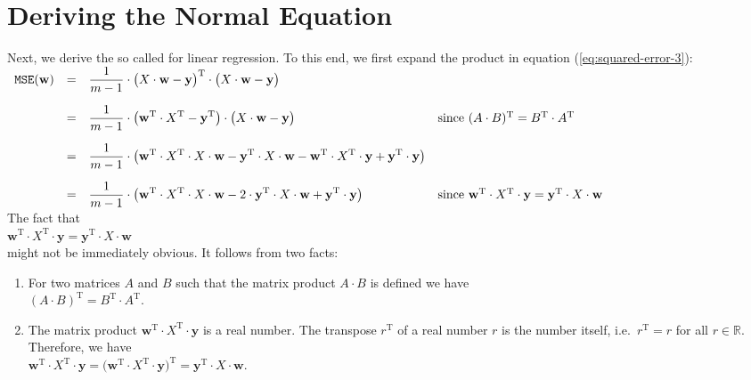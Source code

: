 \section{Deriving the Normal Equation}
Next, we derive the so called  for linear regression.  To this end, we first
expand the product in equation (\ref{eq:squared-error-3}):
\\[0.2cm]
\hspace*{0.3cm}
$
\begin{array}[t]{lcll}
 \mathtt{MSE}(\mathbf{w}) & = & 
 \displaystyle \frac{1}{m-1} \cdot \bigl(X \cdot \mathbf{w} - \textbf{y}\bigr)^\textrm{T} \cdot \bigl(X \cdot \mathbf{w} - \textbf{y}\bigr) 
 \\[0.5cm]
 & = & 
 \displaystyle \frac{1}{m-1} \cdot \bigl(\mathbf{w}^\textrm{T} \cdot X^\textrm{T} - \textbf{y}^\textrm{T}\bigr) \cdot \bigl(X \cdot \mathbf{w} - \textbf{y}\bigr) 
 & \mbox{since $(A \cdot B)^\textrm{T} = B^\textrm{T} \cdot A^\textrm{T}$}
 \\[0.5cm]
 & = & 
 \displaystyle \frac{1}{m-1} \cdot \bigl(\mathbf{w}^\textrm{T} \cdot X^\textrm{T} \cdot X \cdot \mathbf{w} 
                             - \textbf{y}^\textrm{T} \cdot X \cdot \mathbf{w} 
                             - \mathbf{w}^\textrm{T} \cdot X^\textrm{T} \cdot \mathbf{y}
                             + \mathbf{y}^\textrm{T} \cdot \mathbf{y}
                       \bigr)
 \\[0.5cm]
 & = & 
 \displaystyle \frac{1}{m-1} \cdot \bigl(\mathbf{w}^\textrm{T} \cdot X^\textrm{T} \cdot X \cdot \mathbf{w} 
                             - 2 \cdot \textbf{y}^\textrm{T} \cdot X \cdot \mathbf{w} 
                             + \mathbf{y}^\textrm{T} \cdot \mathbf{y}
                       \bigr)
 & \mbox{since $\mathbf{w}^\textrm{T} \cdot X^\textrm{T} \cdot \mathbf{y} = \textbf{y}^\textrm{T} \cdot X \cdot \mathbf{w}$}
\end{array}
$
\\[0.2cm]
The fact that 
\\[0.2cm]
\hspace*{1.3cm}
$\mathbf{w}^\textrm{T} \cdot X^\textrm{T} \cdot \mathbf{y} = \textbf{y}^\textrm{T} \cdot X \cdot \mathbf{w}$
\\[0.2cm]
might not be immediately obvious.  It follows from two facts:
\begin{enumerate}
\item For two matrices $A$ and $B$ such that the matrix product $A \cdot B$ is defined we have 
      \\[0.2cm]
      \hspace*{1.3cm}
      $(A \cdot B)^\mathrm{T} = B^\mathrm{T} \cdot A^\mathrm{T}$.
\item The matrix product $\mathbf{w}^\textrm{T} \cdot X^\textrm{T} \cdot \mathbf{y}$ is a real number.  The transpose $r^\textrm{T}$ of a real number $r$ is the number
      itself, i.e.~$r^\textrm{T} = r$ for all $r \in \mathbb{R}$.  Therefore, we have
      \\[0.2cm]
      \hspace*{1.3cm}
      $\mathbf{w}^\textrm{T} \cdot X^\textrm{T} \cdot \mathbf{y} = 
\bigl(\mathbf{w}^\textrm{T} \cdot X^\textrm{T} \cdot \mathbf{y}\bigr)^\textrm{T} =
\mathbf{y}^\textrm{T} \cdot X \cdot \mathbf{w}
$.
\end{enumerate}
